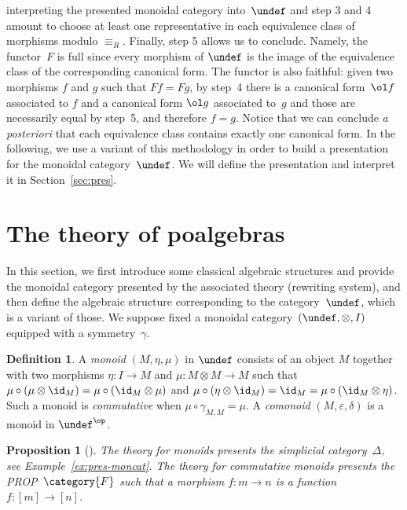 \documentclass[submission,copyright,creativecommons]{eptcs}
\let\P\undef
\let\C\undef
\newtheorem{proposition}[theorem]{Proposition}
\theoremstyle{definition}
\newtheorem{definition}[theorem]{Definition}
\theoremstyle{remark}
\begin{document}
interpreting the presented monoidal category into~$\C$ and step 3 and 4 amount
to choose at least one representative in each equivalence class of morphisms
modulo $\equiv_R$. Finally, step 5 allows us to conclude. Namely, the
functor~$F$ is full since every morphism of $\C$ is the image of the equivalence
class of the corresponding canonical form. The functor is also faithful: given
two morphisms $f$ and $g$ such that $Ff=Fg$, by step~4 there is a canonical
form~$\ol f$ associated to $f$ and a canonical form $\ol g$ associated to~$g$
and those are necessarily equal by step~5, and therefore $f=g$. Notice that we
can conclude \emph{a posteriori} that each equivalence class contains exactly
one canonical form.
In the following, we use a variant of this methodology in order to build a
presentation for the monoidal category~$\P$. We will define the presentation and
interpret it in Section~\ref{sec:pres}.

\section{The theory of poalgebras}
\label{sec:poalgebras}
In this section, we first introduce some classical algebraic structures and
provide the monoidal category presented by the associated theory (\ie rewriting
system), and then define the algebraic structure corresponding to the
category~$\P$, which is a variant of those. We suppose fixed a monoidal
category~$(\C,\otimes,I)$ equipped with a symmetry~$\gamma$.

\begin{definition}
  \label{def:monoid}
  A \emph{monoid} $(M,\eta,\mu)$ in $\C$ consists of an object $M$ together with
  two morphisms $\eta:I\to M$ and $\mu:M\otimes M\to M$ such that
  $\mu\circ(\mu\otimes\id_M)=\mu\circ(\id_M\otimes\mu)$ and
  $\mu\circ(\eta\otimes\id_M)=\id_M=\mu\circ(\id_M\otimes\eta)$. Such a monoid
  is \emph{commutative} when $\mu\circ\gamma_{M,M}=\mu$. A \emph{comonoid}
  $(M,\varepsilon,\delta)$ is a monoid in $\C^\op$.
\end{definition}

\begin{proposition}[\cite{maclane:cwm, lafont2003towards}]
  \label{prop:free-monoid}
  The theory for monoids presents the simplicial category~$\Delta$, see
  Example~\ref{ex:pres-moncat}. The theory for commutative monoids presents the
  PROP~$\category{F}$ such that a morphism $f:m\to n$ is a function
  $f:[m]\to[n]$.
\end{proposition}
\end{document}
